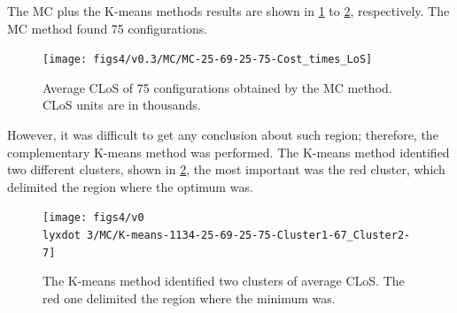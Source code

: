 The MC plus the K-means methods results are shown in \ref{subfig:mc4-3}
to \ref{subfig:km4-3}, respectively. The MC method found 75 configurations.
\begin{figure}[H]
\centering{}\texttt{[image: figs4/v0.3/MC/MC-25-69-25-75-Cost\_times\_LoS]}\caption{Average CLoS of 75 configurations obtained by the MC method. CLoS
units are in thousands. \label{subfig:mc4-3}}
\end{figure}
However, it was difficult to get any conclusion about such region;
therefore, the complementary K-means method was performed. The K-means
method identified two different clusters, shown in \ref{subfig:km4-3},
the most important was the red cluster, which delimited the region
where the optimum was. %

\begin{figure}[H]
\begin{centering}
\texttt{[image: figs4/v0\\lyxdot 3/MC/K-means-1134-25-69-25-75-Cluster1-67\_Cluster2-7]}
\par\end{centering}

\caption{The K-means method identified two clusters of average CLoS. The red
one delimited the region where the minimum was. \label{subfig:km4-3}}
\end{figure}


